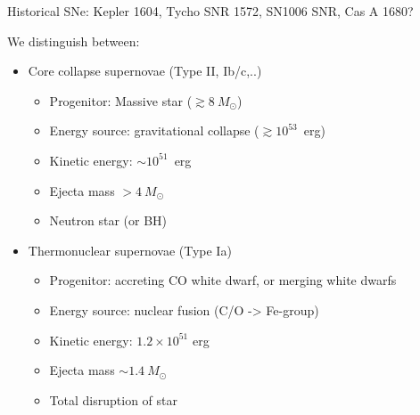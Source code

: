 Historical SNe: Kepler 1604, {\color{red}Tycho SNR 1572}, SN1006 SNR, Cas A 1680?

We distinguish between: 
%
\begin{itemize}
\item Core collapse supernovae (Type II, Ib/c,..)
\begin{itemize}
\item Progenitor: Massive star (\( \gtrsim 8~M_\odot \))
\item Energy source: gravitational collapse (\( \gtrsim 10^{53} \)~erg) 
\item Kinetic energy: \( \sim 10^{51} \)~erg
\item Ejecta mass \( >4~M_\odot \)  
\item Neutron star (or BH)
\end{itemize}
\item Thermonuclear supernovae (Type Ia)
\begin{itemize}
\item Progenitor: accreting CO white dwarf, or merging white dwarfs 
\item Energy source: nuclear fusion (C/O -> Fe-group)
\item Kinetic energy: \( 1.2 \times 10^{51} \) erg
\item Ejecta mass \( \sim 1.4~M_\odot \)
\item Total disruption of star
\end{itemize}
\end{itemize}

%
%
%
%
%
%
%

